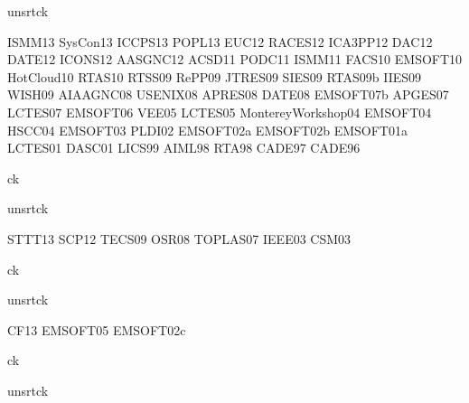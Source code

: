 {unsrtck}

\nocite{conferences}{ISMM13}
\nocite{conferences}{SysCon13}
\nocite{conferences}{ICCPS13}
\nocite{conferences}{POPL13}
\nocite{conferences}{EUC12}
\nocite{conferences}{RACES12}
\nocite{conferences}{ICA3PP12}
\nocite{conferences}{DAC12}
\nocite{conferences}{DATE12}
\nocite{conferences}{ICONS12}
\nocite{conferences}{AASGNC12}
\nocite{conferences}{ACSD11}
\nocite{conferences}{PODC11}
\nocite{conferences}{ISMM11}
\nocite{conferences}{FACS10}
\nocite{conferences}{EMSOFT10}
\nocite{conferences}{HotCloud10}
\nocite{conferences}{RTAS10}
\nocite{conferences}{RTSS09}
\nocite{conferences}{RePP09}
\nocite{conferences}{JTRES09}
\nocite{conferences}{SIES09}
\nocite{conferences}{RTAS09b}
\nocite{conferences}{IIES09}
\nocite{conferences}{WISH09}
\nocite{conferences}{AIAAGNC08}
\nocite{conferences}{USENIX08}
\nocite{conferences}{APRES08}
\nocite{conferences}{DATE08}
\nocite{conferences}{EMSOFT07b}
\nocite{conferences}{APGES07}
\nocite{conferences}{LCTES07}
\nocite{conferences}{EMSOFT06}
\nocite{conferences}{VEE05}
\nocite{conferences}{LCTES05}
\nocite{conferences}{MontereyWorkshop04}
\nocite{conferences}{EMSOFT04}
\nocite{conferences}{HSCC04}
\nocite{conferences}{EMSOFT03}
\nocite{conferences}{PLDI02}
\nocite{conferences}{EMSOFT02a}
\nocite{conferences}{EMSOFT02b}
\nocite{conferences}{EMSOFT01a}
\nocite{conferences}{LCTES01}
\nocite{conferences}{DASC01}
\nocite{conferences}{LICS99}
\nocite{conferences}{AIML98}
\nocite{conferences}{RTA98}
\nocite{conferences}{CADE97}
\nocite{conferences}{CADE96}

{ck}{}


{unsrtck}

\nocite{journals}{STTT13}
\nocite{journals}{SCP12}
\nocite{journals}{TECS09}
\nocite{journals}{OSR08}
\nocite{journals}{TOPLAS07}
\nocite{journals}{IEEE03}
\nocite{journals}{CSM03}

{ck}{}


{unsrtck}

\nocite{invited}{CF13}
\nocite{invited}{EMSOFT05}
\nocite{invited}{EMSOFT02c}

{ck}{}


{unsrtck}

